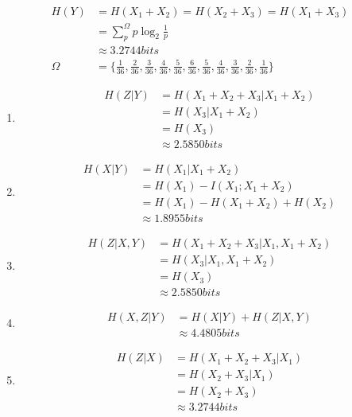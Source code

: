\documentclass{ctexart}
\begin{document}
\begin{align}
    H(Y) &= H(X_1 + X_2) = H(X_2 + X_3) = H(X_1 + X_3) \\
    &= \sum_p^\Omega p\log_2 \frac{1}{p} \\
    &\approx 3.2744 bits \\
    \Omega &= \{\frac{1}{36}, \frac{2}{36}, \frac{3}{36}, \frac{4}{36}, \frac{5}{36}, \frac{6}{36}, \frac{5}{36}, \frac{4}{36}, \frac{3}{36}, \frac{2}{36}, \frac{1}{36}\} 
\end{align}

\begin{enumerate}
    \item\begin{align}
        H(Z|Y) &= H(X_1 + X_2 + X_3|X_1 + X_2) \\
        &= H(X_3|X_1 + X_2) \\
        &= H(X_3) \\
        &\approx 2.5850 bits
    \end{align}
    \item\begin{align}
        H(X|Y) &= H(X_1|X_1 + X_2) \\
        &= H(X_1) - I(X_1; X_1 + X_2) \\
        &= H(X_1) - H(X_1 + X_2) + H(X_2) \\
        &\approx 1.8955 bits
    \end{align}
    \item\begin{align}
        H(Z|X, Y) &= H(X_1 + X_2 + X_3|X_1, X_1 + X_2) \\
        &= H(X_3|X_1, X_1 + X_2) \\
        &= H(X_3) \\
        &\approx 2.5850 bits
    \end{align}
    \item\begin{align}
        H(X, Z|Y) &= H(X|Y) + H(Z|X, Y) \\
        &\approx 4.4805 bits
    \end{align}
    \item\begin{align}
        H(Z|X) &= H(X_1 + X_2 + X_3|X_1) \\
        &= H(X_2 + X_3|X_1) \\
        &= H(X_2 + X_3) \\
        &\approx 3.2744 bits
    \end{align}
\end{enumerate}
\end{document}

